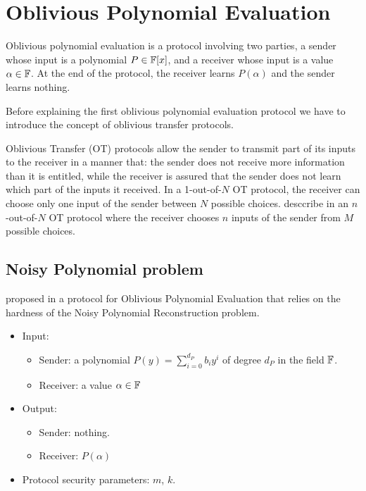 \section{Oblivious Polynomial Evaluation}
Oblivious polynomial evaluation is a protocol involving two parties, a sender whose input is a polynomial $P \in {\mathbb F}[x]$, and a receiver whose input is a value $\alpha \in {\mathbb F}$. At the end of the protocol, the receiver learns $P(\alpha)$ and the sender learns nothing.

Before explaining the first oblivious polynomial evaluation protocol we have to introduce the concept of oblivious transfer protocols.

Oblivious Transfer (OT) protocols allow the sender to transmit part of its inputs to the receiver in a manner that: the sender does not receive more information than it is entitled, while the receiver is assured that the sender does not learn which part of the inputs it received. In a 1-out-of-$N$ OT protocol, the receiver can choose only one input of the sender between $N$ possible choices. \citeauthor{OT} desccribe in \cite{OT} an $n$-out-of-$N$ OT protocol where the receiver chooses $n$ inputs of the sender from $M$ possible choices.

\subsection{Noisy Polynomial problem}

\citeauthor{OPE} proposed in \cite{OPE} a protocol for Oblivious Polynomial Evaluation that relies on the hardness of the Noisy Polynomial Reconstruction problem.

\begin{itemize}
    \item Input:
    
    \begin{itemize}
        \item Sender: a polynomial $P(y) = \sum_{i=0}^{d_P} b_i y^i$ of degree $d_P$ in the field ${\mathbb F}$.
        \item Receiver: a value $\alpha \in {\mathbb F}$
    \end{itemize}
    
    \item Output:
    
    \begin{itemize}
        \item Sender: nothing.
        \item Receiver: $P(\alpha)$
    \end{itemize}
    
    \item Protocol security parameters: $m$, $k$.
    
\end{itemize}

